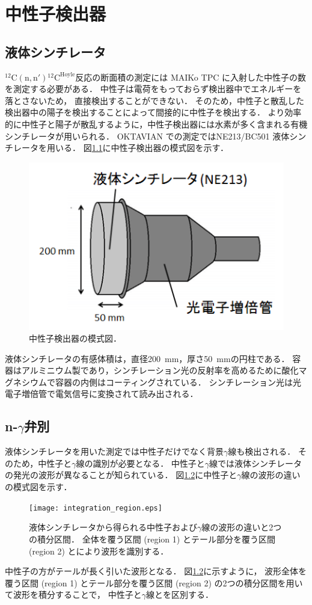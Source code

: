 \documentclass[../master]{subfiles}
\begin{document}
\chapter{中性子検出器}
\section{液体シンチレータ}
${}^{12}\mathrm{C}(\mathrm{n},\mathrm{n}'){}^{12}\mathrm{C}^{\text{Hoyle}}$反応の断面積の測定には
MAIKo TPC に入射した中性子の数を測定する必要がある．
中性子は電荷をもっておらず検出器中でエネルギーを落とさないため，
直接検出することができない．
そのため，中性子と散乱した検出器中の陽子を検出することによって間接的に中性子を検出する．
より効率的に中性子と陽子が散乱するように，中性子検出器には水素が多く含まれる有機シンチレータが用いられる．
OKTAVIAN での測定ではNE213/BC501 液体シンチレータを用いる．
図\ref{fig::neutron_detector}に中性子検出器の模式図を示す．
\begin{figure}
  \centering
  \includegraphics[clip, width=0.6\columnwidth]{pic/neutron_detector.png}
  \caption{中性子検出器の模式図．}
  \label{fig::neutron_detector}
\end{figure}
液体シンチレータの有感体積は，直径\SI{200}{\milli\metre}，厚さ\SI{50}{\milli\metre}の円柱である．
容器はアルミニウム製であり，シンチレーション光の反射率を高めるために酸化マグネシウムで容器の内側はコーティングされている．
シンチレーション光は光電子増倍管で電気信号に変換されて読み出される．

\section{n-$\gamma$弁別}
液体シンチレータを用いた測定では中性子だけでなく背景$\gamma$線も検出される．
そのため，中性子と$\gamma$線の識別が必要となる．
中性子と$\gamma$線では液体シンチレータの発光の波形が異なることが知られている．
図\ref{fig::pulse_shape_n_gamma}に中性子と$\gamma$線の波形の違いの模式図を示す．
\begin{figure}
  \centering
  \texttt{[image: integration\_region.eps]}
  \caption[液体シンチレータから得られる中性子および$\gamma$線の波形の違いと2つの積分区間．]
          {液体シンチレータから得られる中性子および$\gamma$線の波形の違いと2つの積分区間．
            全体を覆う区間 (region 1) とテール部分を覆う区間 (region 2) とにより波形を識別する．
          }
  \label{fig::pulse_shape_n_gamma} 
\end{figure}
中性子の方がテールが長く引いた波形となる．
図\ref{fig::pulse_shape_n_gamma}に示すように，
波形全体を覆う区間 (region 1) とテール部分を覆う区間 (region 2) の2つの積分区間を用いて波形を積分することで，
中性子と$\gamma$線とを区別する．
\end{document}
